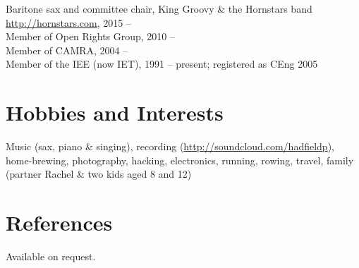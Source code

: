 \documentclass[line]{resume}
\begin{document}
\begin{resume}
    Baritone sax and committee chair, King Groovy \& the Hornstars band \url{http://hornstars.com}, 2015 -- \vspace{0.5mm}\\%
    Member of Open Rights Group, 2010 --                                                              \vspace{0.5mm}\\%
    Member of CAMRA, 2004 --                                                                          \vspace{0.5mm}\\%
    Member of the IEE (now IET), 1991 -- present; registered as CEng 2005

    \section{\mysidestyle Hobbies and Interests}

    Music (sax, piano \& singing), recording (\url{http://soundcloud.com/hadfieldp}), home-brewing, photography,
    hacking, electronics, running, rowing, travel, family (partner Rachel \& two kids aged 8 and 12)

    \section{\mysidestyle References} 

    Available on request.
\end{resume}
\end{document}
